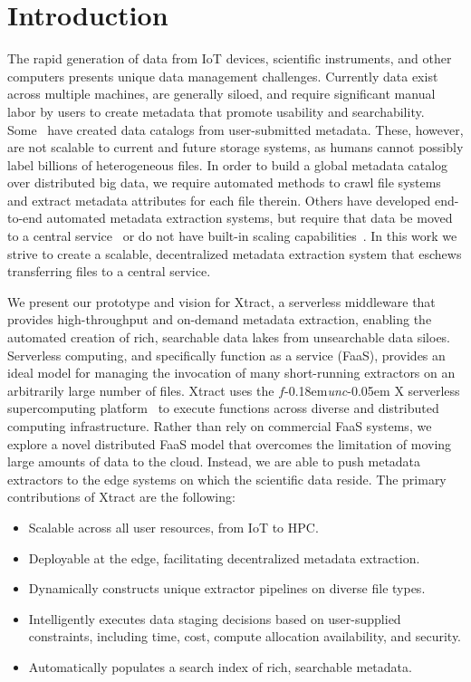 \documentclass[sigconf, 9pt]{acmart}
\newcommand{\name}{Xtract}
\newcommand{\funcx}{$f$\kern-0.18em\emph{unc}\kern-0.05em X}
\begin{document}
\section{Introduction}

The rapid generation of data from IoT devices, scientific instruments, and other computers presents unique 
data management challenges. Currently data exist across multiple machines, are generally siloed, and require 
significant manual labor by users to create metadata that promote usability and searchability. Some~\cite{egan2003vizier, dataverse}  have created data catalogs from user-submitted metadata. These, however, are not scalable to current and future storage systems,
as humans cannot possibly label billions of heterogeneous files.   
In order to build a global metadata catalog over distributed big data, we require automated methods to crawl file systems and extract 
metadata attributes for each file therein. Others have developed end-to-end 
automated metadata extraction systems, but require that data be moved to a central service~\cite{skluzacek2018skluma, skluzacek2016klimatic, padhy2015brown, rodrigo2018sciencesearch} or do not have built-in scaling capabilities~\cite{mattmann2011tika}. 
In this work we strive to create a scalable, decentralized metadata extraction system that eschews transferring files to a central service.  

We present our prototype and vision for \name{},
a serverless middleware that provides high-throughput and on-demand metadata 
extraction, enabling the automated creation of rich, searchable data lakes from unsearchable data siloes. 
Serverless computing, and specifically function as a service (FaaS),
provides an ideal model for managing the invocation of
many short-running extractors on an arbitrarily large number of files. 
\name{} uses the \funcx{} serverless supercomputing platform~\cite{chard2019serverless}
to execute functions across diverse and distributed computing infrastructure.
Rather than rely on commercial FaaS systems, we explore a novel distributed FaaS model 
that overcomes the limitation of moving large amounts of data to the cloud. 
Instead, we are able to push
metadata extractors to the edge systems on which the scientific data reside. 
The primary contributions of \name{} are the following: 
\begin{itemize}
\item Scalable across all user resources, from IoT to HPC. 
\item Deployable at the edge, facilitating decentralized metadata extraction.
\item Dynamically constructs unique extractor pipelines on diverse file types. 
\item Intelligently executes data staging decisions based on user-supplied constraints, including time, cost, compute allocation availability, and security. 
\item Automatically populates a search index of rich, searchable metadata. 
\end{itemize}
\end{document}
